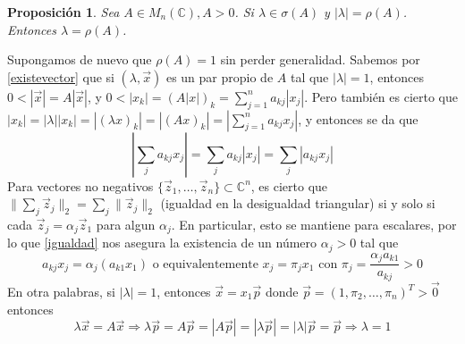 \documentclass[size=a4, parskip=half, titlepage=false, toc=flat, toc=bib, 12pt]{scrartcl}
\makeatletter
\renewenvironment{proof}[1][\proofname] {\par\pushQED{\qed}\normalfont\topsep6\p@\@plus6\p@\relax\trivlist\item[\hskip\labelsep\itshape\tgpaella#1\@addpunct{.}]\ignorespaces}{\popQED\endtrivlist\@endpefalse}
\theoremstyle{theorem-style}
\newtheorem{nprop}{Proposición}[section]
\theoremstyle{definition-style}
\theoremstyle{remark-style}
\theoremstyle{example-style}
\theoremstyle{definition-style}
\theoremstyle{remark-style}
\makeatother
\begin{document}
\begin{nprop}
Sea $A \in M_n(\mathbb{C}), A > 0$. Si $\lambda \in \sigma(A)$ y $|\lambda| = \rho(A)$. Entonces $\lambda = \rho(A)$.
\end{nprop}
\begin{proof}
Supongamos de nuevo que $\rho(A) = 1$ sin perder generalidad. Sabemos por \ref{existevector} que si $(\lambda , \vec{x})$ es un par propio de $A$ tal que $|\lambda| = 1$, entonces $0 < |\vec{x}| = A |\vec{x}|$, y $0 < |x_k| = (A|x|)_k = \sum_{j = 1}^n a_{kj} |x_j|$. Pero también es cierto que $|x_k| = |\lambda||x_k| = |(\lambda x)_k| = |(Ax)_k| = |\sum_{j=1}^n a_{kj} x_j|$, y entonces se da que
\begin{equation}\label{igualdad} \left| \sum_{j} a_{kj}x_j \right| = \sum_j a_{kj} |x_j| = \sum_j |a_{kj} x_j| \end{equation}
Para vectores no negativos $\{\vec{z}_1, \dots, \vec{z}_n\} \subset \mathbb{C}^n$, es cierto que $\| \sum_j \vec{z}_j \|_2 = \sum_j \|\vec{z}_j \|_2$ (igualdad en la desigualdad triangular) si y solo si cada $\vec{z}_j = \alpha_j \vec{z}_1$ para algun $\alpha_j$. En particular, esto se mantiene para escalares, por lo que \ref{igualdad} nos asegura la existencia de un número $\alpha_j > 0$ tal que
$$a_{kj}x_j = \alpha_j (a_{k1}x_1) \textrm{ o equivalentemente } x_j = \pi_j x_1 \textrm{ con } \pi_j = \frac{\alpha_j a_{k1}}{a_{kj}} > 0$$
En otra palabras, si $|\lambda| = 1$, entonces $\vec{x} = x_1 \vec{p}$ donde $\vec{p} = (1 , \pi_2, \dots, \pi_n)^T > \vec{0}$ entonces
$$\lambda \vec{x} = A \vec{x} \Rightarrow \lambda \vec{p} = A \vec{p} = |A \vec{p}| = |\lambda \vec{p}| = |\lambda|\vec{p} = \vec{p} \Rightarrow \lambda = 1 $$

\end{proof}
\end{document}
